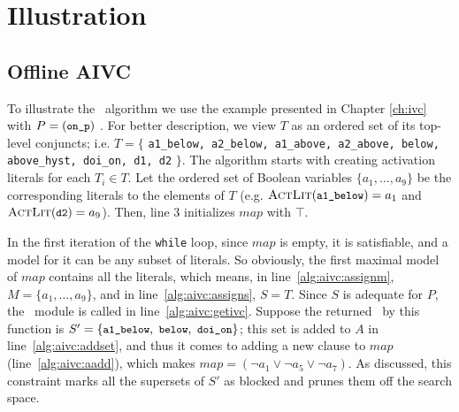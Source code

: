 \section{Illustration}
\subsection{Offline AIVC}
\label{sec:illust}
To illustrate the \aivcalg ~algorithm we use the example presented in Chapter \ref{ch:ivc} with $P = ({\small \texttt{on\_p}})$ .
For better description, we view $T$ as an ordered set of its top-level conjuncts; i.e. $T = \{$ {\small \texttt{a1\_below, a2\_below, a1\_above, a2\_above, below, above\_hyst, doi\_on, d1, d2}} $\}$.
The algorithm starts with creating activation literals for each $T_i \in T$. Let the ordered set of Boolean variables $\{ a_1, \ldots , a_9 \}$ be the corresponding literals to the elements of $T$ (e.g. $\textsc{ActLit} ({ \small \texttt{a1\_below}}) = a_1$ and $\textsc{ActLit} ({\small \texttt{d2}}) = a_9$). Then, line 3 initializes $map$ with $\top$.

In the first iteration of the \texttt{while} loop, since $map$ is
empty, it is satisfiable, and a model for it can be any subset of
literals. So obviously, the first maximal model of $map$ contains all
the literals, which means, in line~\ref{alg:aivc:assignm}, $M = \{a_1,
\ldots, a_9\}$, and in line~\ref{alg:aivc:assigns}, $S = T$. Since $S$
is adequate for $P$, the \getivc ~module is called in
line~\ref{alg:aivc:getivc}. Suppose the returned \mivc\ by this function
is $S' = \{ { \small \texttt{a1\_below},~\texttt{below},
  ~\texttt{doi\_on}}\}$; this set is added to $A$ in
line~\ref{alg:aivc:addset}, and thus it comes to adding a new clause
to $map$ (line~\ref{alg:aivc:aadd}), which makes $map = (\neg a_1 \vee
\neg a_5 \vee \neg a_7)$. As discussed, this constraint
marks all the supersets of $S'$ as blocked and prunes them off the
search space.

